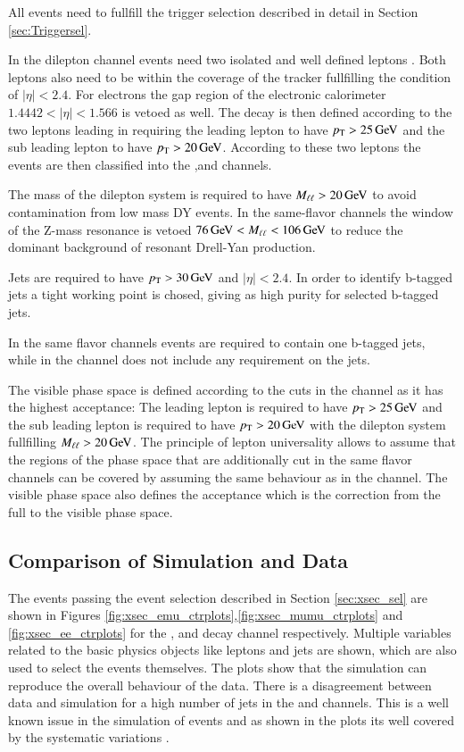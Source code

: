 All events need to fullfill the trigger selection described in detail in Section \ref{sec:Triggersel}.

In the dilepton channel events need two isolated and well defined leptons .
Both leptons also need to be within the coverage of the tracker fullfilling the condition of $|\eta| < 2.4$.
For electrons the gap region of the electronic calorimeter $1.4442<|\eta|<1.566$ is vetoed as well.
The decay is then defined according to the two leptons leading in \pt requiring the leading lepton to have $p_{\mathrm{T}} > 25 \,\text{Ge\hspace{-.08em}V}$
and the sub leading lepton to have $p_{\mathrm{T}} > 20 \,\text{Ge\hspace{-.08em}V}$. 
According to these two leptons the events are then classified into the \emu,\ee and \mumu channels.

The mass of the dilepton system is required to have $M_{\ell\ell} > 20 \,\text{Ge\hspace{-.08em}V}$ to avoid contamination from low mass DY events.
In the same-flavor channels the window of the Z-mass resonance is vetoed $76 \,\text{Ge\hspace{-.08em}V} < M_{\ell\ell} <106 \,\text{Ge\hspace{-.08em}V}$ to reduce the dominant background of 
resonant Drell-Yan production.

Jets are required to have $p_{\mathrm{T}} > 30 \,\text{Ge\hspace{-.08em}V}$ and $|\eta|<2.4$. In order to identify b-tagged jets a tight working point is chosed, giving as high 
purity for selected b-tagged jets.

In the same flavor channels events are required to contain one b-tagged jets, while in the \emu channel does not include any requirement on the jets.

The visible phase space is defined according to the cuts in the \emu channel as it has the highest acceptance:
The leading lepton is required to have $p_{\mathrm{T}} > 25 \,\text{Ge\hspace{-.08em}V}$ and the sub leading lepton is required to have $p_{\mathrm{T}} > 20 \,\text{Ge\hspace{-.08em}V}$ with the dilepton system
fullfilling $M_{\ell\ell} > 20 \,\text{Ge\hspace{-.08em}V}$. The principle of lepton universality allows to assume that the regions of the phase space that are additionally cut in the 
same flavor channels can be covered by assuming the same behaviour as in the \emu channel.
The visible phase space also defines the acceptance which is the correction from the full to the visible phase space.



\subsection{Comparison of Simulation and Data}
\label{sec:xsec_datamc}

The events passing the event selection described in Section \ref{sec:xsec_sel} are shown in Figures \ref{fig:xsec_emu_ctrplots},\ref{fig:xsec_mumu_ctrplots} and \ref{fig:xsec_ee_ctrplots} for the \emu, \mumu and \ee decay channel respectively. Multiple variables related to the basic physics objects like leptons and jets are shown, which are also used to select the events themselves. The plots show that the simulation can reproduce the overall  behaviour of the data. 
There is a disagreement between data and simulation for a high number of jets in the \emu and \mumu channels. This is a well known issue in the simulation of \ttbar events and as shown in the plots its well covered by the systematic variations . 

